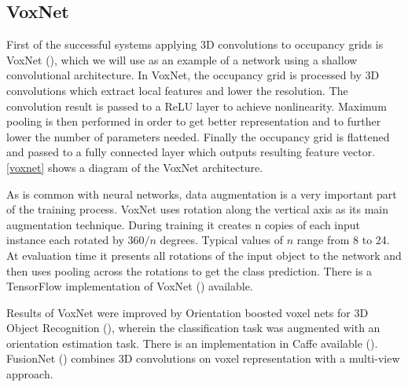 \subsection{VoxNet}
First of the successful systems applying 3D convolutions to occupancy grids is VoxNet (\cite{maturana_voxnet:_2015}), which we will use as an example of a network using a shallow convolutional architecture. 
In VoxNet, the occupancy grid is processed by 3D convolutions which extract local features and lower the resolution. The convolution result is passed to a ReLU layer to achieve nonlinearity. Maximum pooling is then performed in order to get better representation and to further lower the number of parameters needed. Finally the occupancy grid is flattened and passed to a fully connected layer which outputs resulting feature vector. \autoref{voxnet} shows a diagram of the VoxNet architecture.\par  
As is common with neural networks, data augmentation is a very important part of the training process. VoxNet uses rotation along the vertical axis as its main augmentation technique. During training it creates n copies of each input instance each rotated by $360/n$ degrees. Typical values of $n$ range from 8 to 24. At evaluation time it presents all rotations of the input object to the network and then uses pooling across the rotations to get the class prediction. There is a TensorFlow implementation of VoxNet (\cite{maturana_voxnet_2016}) available.\par
Results of VoxNet were improved by Orientation boosted voxel nets for 3D Object Recognition (\cite{sedaghat_orientation-boosted_2016}), wherein the classification task was augmented
with an orientation estimation task. There is an implementation in Caffe available (\cite{sedaghat_orion_2016}). FusionNet (\cite{hegde_fusionnet:_2016}) combines 3D convolutions on voxel representation with a multi-view approach.



